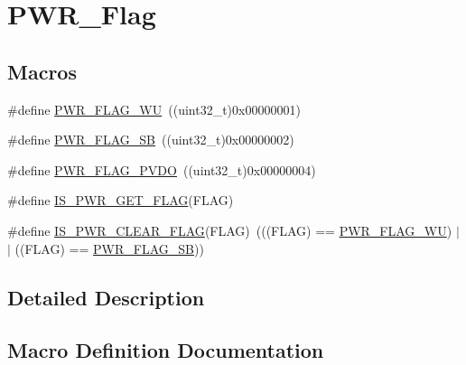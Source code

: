 \hypertarget{group___p_w_r___flag}{}\section{P\+W\+R\+\_\+\+Flag}
\label{group___p_w_r___flag}
\subsection*{Macros}
\begin{DoxyCompactItemize}
\item 
\#define \mbox{\hyperlink{group___p_w_r___flag_ga2d06760a5769e729b06d41e37036d58e}{P\+W\+R\+\_\+\+F\+L\+A\+G\+\_\+\+WU}}~((uint32\+\_\+t)0x00000001)
\item 
\#define \mbox{\hyperlink{group___p_w_r___flag_ga9e55f0b5dec2346d5c8dee3ab3c0c2df}{P\+W\+R\+\_\+\+F\+L\+A\+G\+\_\+\+SB}}~((uint32\+\_\+t)0x00000002)
\item 
\#define \mbox{\hyperlink{group___p_w_r___flag_gaefd05d58cc050eeef83a1b5c520b2c2a}{P\+W\+R\+\_\+\+F\+L\+A\+G\+\_\+\+P\+V\+DO}}~((uint32\+\_\+t)0x00000004)
\item 
\#define \mbox{\hyperlink{group___p_w_r___flag_gadc822638d0dd52d2f920808dd96c00a1}{I\+S\+\_\+\+P\+W\+R\+\_\+\+G\+E\+T\+\_\+\+F\+L\+AG}}(F\+L\+AG)
\item 
\#define \mbox{\hyperlink{group___p_w_r___flag_ga36d35a770e683e4a0baf3aac350fcb5a}{I\+S\+\_\+\+P\+W\+R\+\_\+\+C\+L\+E\+A\+R\+\_\+\+F\+L\+AG}}(F\+L\+AG)~(((F\+L\+AG) == \mbox{\hyperlink{group___p_w_r___flag_ga2d06760a5769e729b06d41e37036d58e}{P\+W\+R\+\_\+\+F\+L\+A\+G\+\_\+\+WU}}) $\vert$$\vert$ ((F\+L\+AG) == \mbox{\hyperlink{group___p_w_r___flag_ga9e55f0b5dec2346d5c8dee3ab3c0c2df}{P\+W\+R\+\_\+\+F\+L\+A\+G\+\_\+\+SB}}))
\end{DoxyCompactItemize}


\subsection{Detailed Description}


\subsection{Macro Definition Documentation}
\mbox{\label{group___p_w_r___flag_ga36d35a770e683e4a0baf3aac350fcb5a}} 
